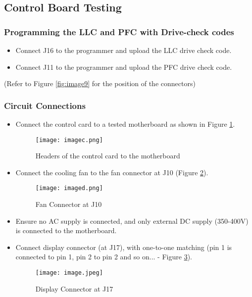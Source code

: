 \subsection{Control Board Testing}

\subsubsection{Programming the LLC and PFC with Drive-check codes}
\begin{itemize}
    \item Connect J16 to the programmer and upload the LLC drive check code.
    \item Connect J11 to the programmer and upload the PFC drive check code.
\end{itemize}
(Refer to Figure \ref{fig:image9} for the position of the connectors)

\subsubsection{Circuit Connections}
\begin{itemize}
    \item Connect the control card to a tested motherboard as shown in Figure \ref{fig:imagec}.
    \begin{figure}[H]
        \centering
        \texttt{[image: imagec.png]}
        \caption{Headers of the control card to the motherboard}
        \label{fig:imagec}
    \end{figure}
    
    \item Connect the cooling fan to the fan connector at J10 (Figure \ref{fig:imaged}).
    \begin{figure}[H]
        \centering
        \texttt{[image: imaged.png]}
        \caption{Fan Connector at J10}
        \label{fig:imaged}
    \end{figure}
    
    \item Ensure no AC supply is connected, and only external DC supply (350-400V) is connected to the motherboard.
    \item Connect display connector (at J17), with one-to-one matching (pin 1 is connected to pin 1, pin 2 to pin 2 and so on... - Figure \ref{fig:image_fan}).
    \begin{figure}[H]
        \centering
        \texttt{[image: image.jpeg]}
        \caption{Display Connector at J17}
        \label{fig:image_fan}
    \end{figure}
\end{itemize}

